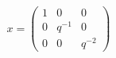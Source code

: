 \begin{equation}
x=\left(
\begin{array}{ccc}
1 & 0 & 0 \\
0 & q^{-1} & 0 \\
0 & 0 & q^{-2}
\end{array}
\right)
\end{equation}

